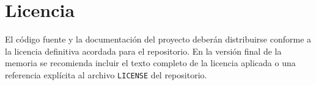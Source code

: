 \chapter{Licencia}

El código fuente y la documentación del proyecto deberán distribuirse conforme a
la licencia definitiva acordada para el repositorio. En la versión final de la
memoria se recomienda incluir el texto completo de la licencia aplicada o una
referencia explícita al archivo \texttt{LICENSE} del repositorio.
